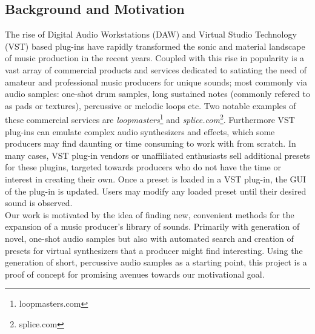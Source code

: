 \documentclass{nime-alternate} %
\begin{document}
\subsection{Background and Motivation}
The rise of Digital Audio Workstations (DAW) \cite{leider2004digital} and Virtual Studio Technology (VST) based plug-ins \cite{tanev2013virtual} have rapidly transformed the sonic and material landscape of music production in the recent years. Coupled with this rise in popularity is a vast array of commercial products and services dedicated to satiating the need of amateur and professional music producers for unique sounds; most commonly via audio samples: one-shot drum samples, long sustained notes (commonly refered to as pads or textures), percussive or melodic loops etc. Two notable examples of these commercial services are \textit{loopmasters}\footnote{loopmasters.com} and \textit{splice.com}\footnote{splice.com}. Furthermore VST plug-ins can emulate complex audio synthesizers and effects, which some producers may find daunting or time consuming to work with from scratch. In many cases, VST plug-in vendors or unaffiliated enthusiasts sell additional presets for these plugins, targeted towards producers who do not have the time or interest in creating their own. Once a preset is loaded in a VST plug-in, the GUI of the plug-in is updated. Users may modify any loaded preset until their desired sound is observed.\\
Our work is motivated by the idea of finding new, convenient methods for the expansion of a music producer's library of sounds. Primarily with generation of novel, one-shot audio samples but also with automated search and creation of presets for virtual synthesizers that a producer might find  interesting. Using the generation of short, percussive audio samples as a starting point, this project is a proof of concept for promising avenues towards our motivational goal.\\
\end{document}
